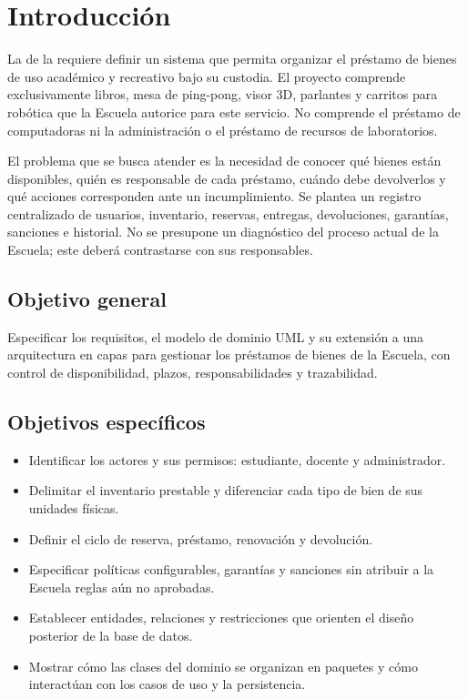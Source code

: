 \chapter{Introducci\'on}
\label{cap:introduccion}

La \escuela{} de la \universidad{} requiere definir un sistema que permita organizar el pr\'estamo de bienes de uso acad\'emico y recreativo bajo su custodia. El proyecto comprende exclusivamente libros, mesa de ping-pong, visor 3D, parlantes y carritos para rob\'otica que la Escuela autorice para este servicio. No comprende el pr\'estamo de computadoras ni la administraci\'on o el pr\'estamo de recursos de laboratorios.

El problema que se busca atender es la necesidad de conocer qu\'e bienes est\'an disponibles, qui\'en es responsable de cada pr\'estamo, cu\'ando debe devolverlos y qu\'e acciones corresponden ante un incumplimiento. Se plantea un registro centralizado de usuarios, inventario, reservas, entregas, devoluciones, garant\'ias, sanciones e historial. No se presupone un diagn\'ostico del proceso actual de la Escuela; este deber\'a contrastarse con sus responsables.

\section{Objetivo general}

Especificar los requisitos, el modelo de dominio UML y su extensi\'on a una arquitectura en capas para gestionar los pr\'estamos de bienes de la Escuela, con control de disponibilidad, plazos, responsabilidades y trazabilidad.

\section{Objetivos espec\'ificos}

\begin{itemize}
    \item Identificar los actores y sus permisos: estudiante, docente y administrador.
    \item Delimitar el inventario prestable y diferenciar cada tipo de bien de sus unidades f\'isicas.
    \item Definir el ciclo de reserva, pr\'estamo, renovaci\'on y devoluci\'on.
    \item Especificar pol\'iticas configurables, garant\'ias y sanciones sin atribuir a la Escuela reglas a\'un no aprobadas.
    \item Establecer entidades, relaciones y restricciones que orienten el dise\~no posterior de la base de datos.
    \item Mostrar c\'omo las clases del dominio se organizan en paquetes y c\'omo interact\'uan con los casos de uso y la persistencia.
\end{itemize}

